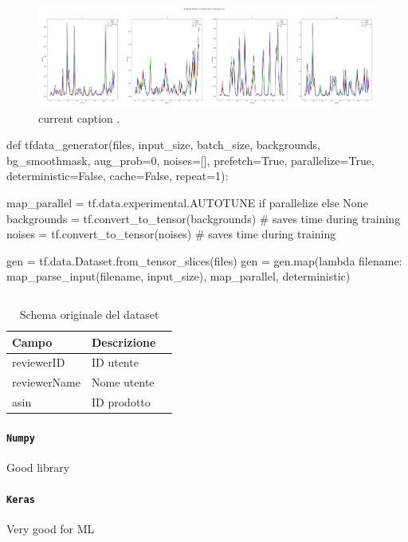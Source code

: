 \begin{figure}[!htb]
\centering
\includegraphics[width=.55\textwidth]{"contents/images/20210110_172810 - origtest11030(len11030)_fps30_w5"}
\caption[list of figures caption]{current caption \cite[][]{shojaei2011adaptive}.}
\label{fig:differentialdrive}
\end{figure}

\lipsum[2]

\bigskip

\begin{python}
def tfdata_generator(files, input_size, batch_size, backgrounds, 
					 bg_smoothmask, aug_prob=0, noises=[],
					 prefetch=True, parallelize=True, 
					 deterministic=False, cache=False, repeat=1):

	map_parallel = tf.data.experimental.AUTOTUNE if parallelize else None
	backgrounds = tf.convert_to_tensor(backgrounds) # saves time during training
	noises = tf.convert_to_tensor(noises) # saves time during training

	gen = tf.data.Dataset.from_tensor_slices(files)
	gen = gen.map(lambda filename: map_parse_input(filename, input_size), map_parallel, deterministic)
\end{python}

\begin{lstlisting}[frame=none,caption={Protocol used by the manual controller 
to decide, for each robot, the message to transmit and the colour.}, 
label=lst:manualtask2]
\end{lstlisting}


\begin{table}[H]
	\caption{Schema originale del dataset}\label{tab:df-schema}
	\centering
	\begin{tabular}{|l|l|l|}
		\hline
		Campo & Descrizione \\
		\hline
		reviewerID & ID utente \\
		reviewerName & Nome utente \\
		asin & ID prodotto \\
		\hline
	\end{tabular}
\end{table}


\paragraph*{\texttt{Numpy}}
Good library


\paragraph*{\texttt{Keras}}
Very good for ML
